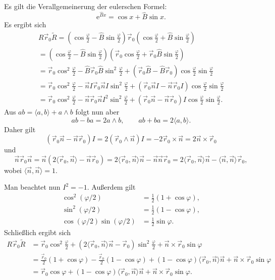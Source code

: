 \documentclass[a4paper,fleqn,11pt]{article}
\theoremstyle{rmbox}
\newcommand{\ee}{\mathrm e}
\begin{document}
Es gilt die Verallgemeinerung der eulerschen Formel:
\begin{equation}
\ee^{\hat B x} = \cos x +\hat B\sin x.
\end{equation}
Es ergibt sich
\begin{gather}
R\vec r_0\tilde R = (\cos\tfrac{\varphi}{2}-\hat B\sin\tfrac{\varphi}{2})
\vec r_0(\cos\tfrac{\varphi}{2}+\hat B\sin\tfrac{\varphi}{2})\\
= (\cos\tfrac{\varphi}{2}-\hat B\sin\tfrac{\varphi}{2})
(\vec r_0\cos\tfrac{\varphi}{2}+\vec r_0\hat B\sin\tfrac{\varphi}{2})\\
= \vec r_0\cos^2\tfrac{\varphi}{2}-\hat B\vec r_0\hat B\sin^2\tfrac{\varphi}{2}
+ (\vec r_0\hat B-\hat B\vec r_0)\cos\tfrac{\varphi}{2}\sin\tfrac{\varphi}{2}\\
= \vec r_0\cos^2\tfrac{\varphi}{2}-\vec n I\vec r_0\vec n I\sin^2\tfrac{\varphi}{2}
+(\vec r_0\vec n I -\vec n \vec r_0 I)\cos\tfrac{\varphi}{2}\sin\tfrac{\varphi}{2}\\
= \vec r_0\cos^2\tfrac{\varphi}{2}-\vec n \vec r_0\vec n I^2\sin^2\tfrac{\varphi}{2}
+(\vec r_0\vec n-\vec n \vec r_0)I\cos\tfrac{\varphi}{2}\sin\tfrac{\varphi}{2}.
\end{gather}
Aus $ab = \langle a,b\rangle+a\wedge b$ folgt nun aber
\begin{equation}
ab-ba = 2a\wedge b,\qquad ab+ba = 2\langle a,b\rangle.
\end{equation}
Daher gilt
\begin{equation}
(\vec r_0\vec n-\vec n\vec r_0)I = 2(\vec r_0\wedge\vec n)I
= -2\vec r_0\times\vec n = 2\vec n\times\vec r_0
\end{equation}
und
\begin{equation}
\vec n \vec r_0\vec n = \vec n(2\langle\vec r_0,\vec n\rangle-\vec n\vec r_0)
= 2\langle\vec r_0,\vec n\rangle\vec n - \vec n\vec n\vec r_0
= 2\langle\vec r_0,\vec n\rangle\vec n - \langle\vec n,\vec n\rangle\vec r_0,
\end{equation}
wobei $\langle\vec n,\vec n\rangle=1$.

Man beachtet nun $I^2=-1$. Außerdem gilt
\begin{align}
\cos^2(\varphi/2)&=\tfrac{1}{2}(1+\cos\varphi),\\
\sin^2(\varphi/2)&=\tfrac{1}{2}(1-\cos\varphi),\\
\cos(\varphi/2)\sin(\varphi/2)&=\tfrac{1}{2}\sin\varphi.
\end{align}
Schließlich ergibt sich
\begin{align}
R\vec r_0\tilde R
&= \vec r_0\cos^2\tfrac{\varphi}{2}+(2\langle\vec r_0,\vec n\rangle\vec n - \vec r_0)\sin^2\tfrac{\varphi}{2}
+\vec n\times\vec r_0\sin\varphi\\
&= \tfrac{\vec r_0}{2}(1+\cos\varphi)-\tfrac{\vec r_0}{2}(1-\cos\varphi)
+(1-\cos\varphi)\langle\vec r_0,\vec n\rangle\vec n
+\vec n\times\vec r_0\sin\varphi\\
&= \vec r_0\cos\varphi
+(1-\cos\varphi)\langle\vec r_0,\vec n\rangle\vec n
+\vec n\times\vec r_0\sin\varphi.
\end{align}
\end{document}
